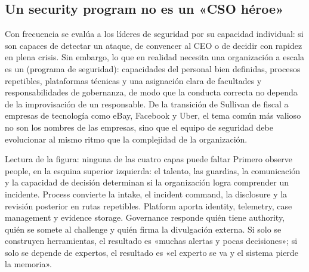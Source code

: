 \subsection{Un security program no es un «CSO héroe»}

Con frecuencia se evalúa a los líderes de seguridad por su capacidad individual: si son capaces de detectar un ataque, de convencer al CEO o de decidir con rapidez en plena crisis. Sin embargo, lo que en realidad necesita una organización a escala es un  (programa de seguridad): capacidades del personal bien definidas, procesos repetibles, plataformas técnicas y una asignación clara de facultades y responsabilidades de gobernanza, de modo que la conducta correcta no dependa de la improvisación de un responsable. De la transición de Sullivan de fiscal a empresas de tecnología como eBay, Facebook y Uber, el tema común más valioso no son los nombres de las empresas, sino que el equipo de seguridad debe evolucionar al mismo ritmo que la complejidad de la organización.


\begin{knowledgebox}{Lectura de la figura: ninguna de las cuatro capas puede faltar}
Primero observe people, en la esquina superior izquierda: el talento, las guardias, la comunicación y la capacidad de decisión determinan si la organización logra comprender un incidente. Process convierte la intake, el incident command, la disclosure y la revisión posterior en rutas repetibles. Platform aporta identity, telemetry, case management y evidence storage. Governance responde quién tiene authority, quién se somete al challenge y quién firma la divulgación externa. Si solo se construyen herramientas, el resultado es «muchas alertas y pocas decisiones»; si solo se depende de expertos, el resultado es «el experto se va y el sistema pierde la memoria».
\end{knowledgebox}


